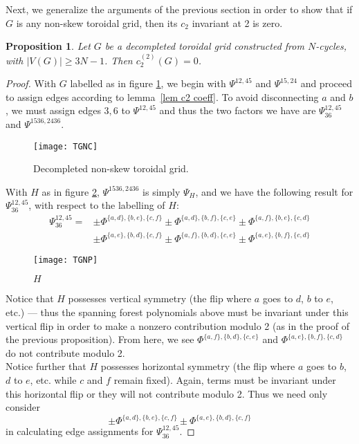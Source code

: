 \documentclass[12pt]{amsart}
\newtheorem{proposition}[definition]{Proposition}
\numberwithin{definition}{section}
\begin{document}

Next, we generalize the arguments of the previous section in order to show that if $G$ is any non-skew toroidal grid, then its $c_2$ invariant at 2 is zero.
\begin{proposition}
	Let $G$ be a decompleted toroidal grid constructed from $N$-cycles, with $|V(G)| \geq  3N-1$. Then $c_2^{(2)}(G)=0$.
\end{proposition}

\begin{proof}
	With $G$ labelled as in figure \ref{fig non skew}, we begin with $\Psi^{12,45}$ and $\Psi^{15,24}$ and proceed to assign edges according to lemma~\ref{lem c2 coeff}. To avoid disconnecting $a$ and $b$, we must assign edges $3,6$ to $\Psi^{12,45}$ and thus the two factors we have are $\Psi_{36}^{12,45}$ and $\Psi^{1536,2436}$. \\
	\begin{figure}[h]
		\texttt{[image: TGNC]}
		\caption{Decompleted non-skew toroidal grid.}\label{fig non skew}
	\end{figure}
	With $H$ as in figure \ref{fig gen H}, $\Psi^{1536,2436}$ is simply $\Psi_H$, and we have the following result for $\Psi_{36}^{12,45}$, with respect to the labelling of $H$:
	\begin{align*}
          \Psi_{36}^{12,45}=& \pm\Phi^{\{a,d\},\{b,e\},\{c,f\}}\pm\Phi^{\{a,d\},\{b,f\},\{c,e\}}\pm\Phi^{\{a,f\},\{b,e\},\{c,d\}} \\
	  & \pm\Phi^{\{a,e\},\{b,d\},\{c,f\}}\pm\Phi^{\{a,f\},\{b,d\},\{c,e\}}\pm\Phi^{\{a,e\},\{b,f\},\{c,d\}}
        \end{align*}
	\begin{figure}[h]
		\texttt{[image: TGNP]}
		\caption{$H$}\label{fig gen H}
	\end{figure}
	Notice that $H$ possesses vertical symmetry (the flip where $a$ goes to $d$, $b$ to $e$, etc.) --- thus the spanning forest polynomials above must be invariant under this vertical flip in order to make a nonzero contribution modulo 2 (as in the proof of the previous proposition). From here, we see $\Phi^{\{a,f\},\{b,d\},\{c,e\}}$ and $\Phi^{\{a,e\},\{b,f\},\{c,d\}}$ do not contribute modulo 2. \\
	Notice further that $H$ possesses horizontal symmetry (the flip where $a$ goes to $b$, $d$ to $e$, etc. while $c$ and $f$ remain fixed). Again, terms must be invariant under this horizontal flip or they will not contribute modulo 2. Thus we need only consider
	\[
        \pm\Phi^{\{a,d\},\{b,e\},\{c,f\}}\pm\Phi^{\{a,e\},\{b,d\},\{c,f\}}\]
        in calculating edge assignments for $\Psi_{36}^{12,45}$.
        

\end{proof}
\end{document}
